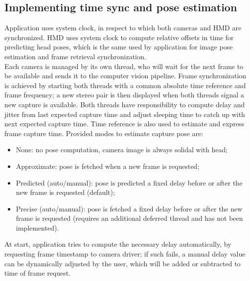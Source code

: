 \subsection{Implementing time sync and pose estimation}

Application uses system clock, in respect to which both cameras and HMD are synchronized. HMD uses system clock to compute relative offsets in time for predicting head poses, which is the same used by application for image pose estimation and frame retrieval synchronization.\\
Each camera is managed by its own thread, who will wait for the next frame to be available and sends it to the computer vision pipeline. Frame synchronization is achieved by starting both threads with a common absolute time reference and frame frequency; a new stereo pair is then displayed when both threads signal a new capture is available. Both threads have responsibility to compute delay and jitter from last expected capture time and adjust sleeping time to catch up with next expected capture time.
Time reference is also used to estimate and express frame capture time. Provided modes to estimate capture pose are:
\begin{itemize}
\item None: no pose computation, camera image is always solidal with head;
\item Approximate: pose is fetched when a new frame is requested;
\item Predicted (auto/manual): pose is predicted a fixed delay before or after the new frame is requested (default);
\item Precise (auto/manual): pose is fetched a fixed delay before or after the new frame is requested (requires an additional deferred thread and has not been implemented).
\end{itemize}
At start, application tries to compute the necessary delay automatically, by requesting frame timestamp to camera driver; if such fails, a manual delay value can be dynamically adjusted by the user, which will be added or subtracted to time of frame request.
